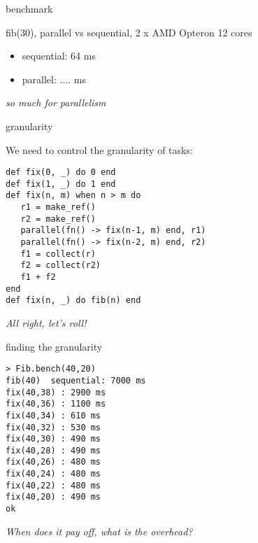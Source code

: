 \begin{frame}{benchmark}

fib(30),  parallel vs sequential, 2 x AMD Opteron 12 cores

\pause\vspace{20pt}

\begin{itemize}
\pause \item sequential: 64 ms 
\pause \item parallel: \pause ....  ms
\end{itemize}

\vspace{20pt}
{\em so much for parallelism}

\end{frame} 

\begin{frame}[fragile]{granularity}

We need to control the granularity of tasks:

 \begin{verbatim}
def fix(0, _) do 0 end
def fix(1, _) do 1 end
def fix(n, m) when n > m do 
   r1 = make_ref()
   r2 = make_ref()
   parallel(fn() -> fix(n-1, m) end, r1)
   parallel(fn() -> fix(n-2, m) end, r2)
   f1 = collect(r)
   f2 = collect(r2)
   f1 + f2
end
def fix(n, _) do fib(n) end
\end{verbatim}

\pause\vspace{20pt}
{\em All right, let's roll!}
\end{frame}

\begin{frame}[fragile]{finding the granularity}

\begin{verbatim}
> Fib.bench(40,20)
fib(40)  sequential: 7000 ms
fix(40,38) : 2900 ms
fix(40,36) : 1100 ms
fix(40,34) : 610 ms
fix(40,32) : 530 ms
fix(40,30) : 490 ms
fix(40,28) : 490 ms
fix(40,26) : 480 ms
fix(40,24) : 480 ms
fix(40,22) : 480 ms
fix(40,20) : 490 ms
ok
\end{verbatim}

{\em When does it pay off, what is the overhead?}

\end{frame}

